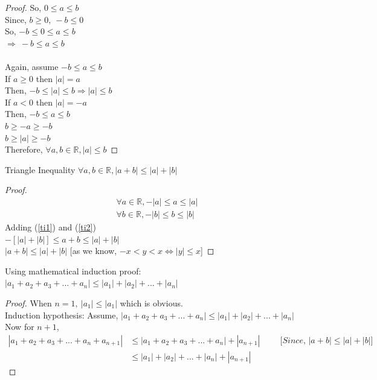 \documentclass{article}
\newcommand{\Rw}{\Rightarrow}
\newcommand{\hs}{\hspace}
\begin{document}
\begin{enumerate}
\begin{proof}
        So, $0\leq a \leq b$\\
        Since, $b\geq 0,\ -b \leq 0$\\
        So, $-b \leq 0 \leq a \leq b$\\
        $\Rw \ -b \leq a \leq b$\\\\
        Again, assume $-b\leq a \leq b$\\
        If $a\geq 0$ then $|a|=a$\\
        Then, $-b\leq |a|\leq b \Rw |a|\leq b$\\
         If $a< 0$ then $|a|=-a$\\
        Then, $-b\leq a\leq b$\\
        $b \geq -a \geq -b$\\
        $b\geq |a|\geq -b$\\
        Therefore, $\forall a,b \in \mathbb{R}, |a|\leq b$
    \end{proof}
\end{enumerate}
\begin{theorem}{Triangle Inequality}{}
    $\forall a,b \in \mathbb{R}, |a+b|\leq|a|+|b|$\\
    \begin{proof}
        \begin{align}
            \forall a \in \mathbb{R}, -|a|\leq a \leq |a| \label{ti1} \\
            \forall b \in \mathbb{R}, -|b|\leq b \leq |b| \label{ti2}
        \end{align}
        Adding (\ref{ti1}) and (\ref{ti2})\\
        $-[|a|+|b|]\leq a+b \leq |a|+|b|$\\
        $|a+b|\leq |a|+|b|$\hs{1cm} [as we know, $-x<y<x \Leftrightarrow |y|\leq x$]
    \end{proof}
\end{theorem}
\begin{theorem}{}{}
    Using mathematical induction proof:\\
$|a_1+a_2+a_3+...+a_n|\leq |a_1|+|a_2|+...+|a_n|$\\
\begin{proof}
    When $n=1,\ |a_1|\leq|a_1|$ which is obvious.\\
    Induction hypothesis: Assume, $|a_1+a_2+a_3+...+a_n|\leq |a_1|+|a_2|+...+|a_n|$\\
    Now for $n+1$,\\
    \begin{align*}
        |a_1+a_2+a_3+...+a_n+a_{n+1}|&\leq |a_1+a_2+a_3+...+a_n|+|a_{n+1}|\hs{1cm}\textit{[Since, $|a+b|\leq |a|+|b|$]}\\
        &\leq |a_1|+|a_2|+...+|a_n|+|a_{n+1}|
    \end{align*}
\end{proof}
\end{theorem}
\end{document}
